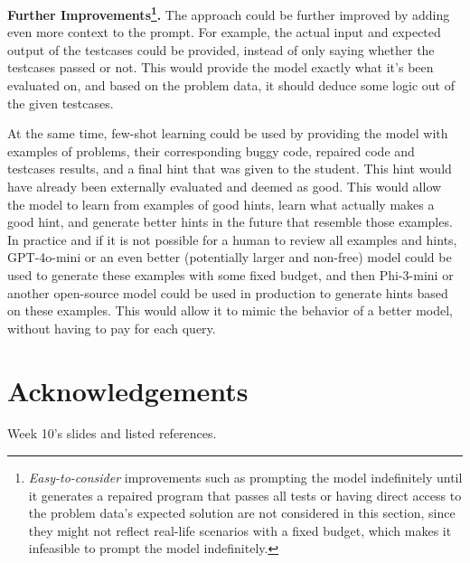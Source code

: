 \documentclass{article}
\begin{document}
\textbf{Further Improvements\footnote{\textit{Easy-to-consider} improvements such as prompting the model indefinitely until it generates a repaired program that passes all tests or having direct access to the problem data's expected solution are not considered in this section, since they might not reflect real-life scenarios with a fixed budget, which makes it infeasible to prompt the model indefinitely.}.} The approach could be further improved by adding even more context to the prompt. For example, the actual input and expected output of the testcases could be provided, instead of only saying whether the testcases passed or not. This would provide the model exactly what it's been evaluated on, and based on the problem data, it should deduce some logic out of the given testcases. 

At the same time, few-shot learning could be used by providing the model with examples of problems, their corresponding buggy code, repaired code and testcases results, and a final hint that was given to the student. This hint would have already been externally evaluated and deemed as good. This would allow the model to learn from examples of good hints, learn what actually makes a good hint, and generate better hints in the future that resemble those examples. In practice and if it is not possible for a human to review all examples and hints, GPT-4o-mini or an even better (potentially larger and non-free) model could be used to generate these examples with some fixed budget, and then Phi-3-mini or another open-source model could be used in production to generate hints based on these examples. This would allow it to mimic the behavior of a better model, without having to pay for each query.


\clearpage

\section*{Acknowledgements}
Week 10's slides and listed references.
\end{document}
